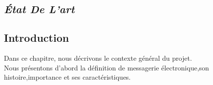 \documentclass[french]{report}
\renewcommand{\chaptermark}[1]{\markboth{#1}{}}
\begin{document}
\begin{titlepage}
\begin{titlepage}
\renewcommand*{\thepage}{\arabic{page}}%
\setcounter{page}{4}%
\chapter{
\textit{ État De L'art }
 }
\end{titlepage}
\renewcommand{\chaptermark}[1]{\markboth{#1}{}}
\pagestyle{fancy}
\renewcommand*{\thepage}{\arabic{page}}%
\setcounter{page}{5}%
\section{\LARGE Introduction}     
\LARGE Dans ce chapitre, nous décrivons le contexte général du projet. \\Nous présentons d’abord la définition de messagerie électronique,son histoire,importance et ses caractéristiques. 

\end{titlepage}
\end{document}
